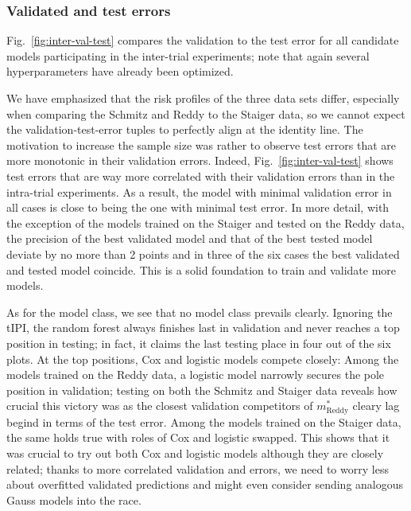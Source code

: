 \subsubsection{Validated and test errors}



Fig.\ \ref{fig:inter-val-test} compares the validation to the test error for all candidate models 
participating in the inter-trial experiments; note that again several hyperparameters have already 
been optimized. 

We have emphasized that the risk profiles of the three data sets differ, especially when comparing 
the Schmitz and Reddy to the Staiger data, so we cannot expect the validation-test-error tuples 
to perfectly align at the identity line. The motivation to increase the sample size was rather 
to observe test errors that are more monotonic in their validation errors. Indeed, Fig.\ 
\ref{fig:inter-val-test} shows test errors that are way more correlated with their validation errors 
than in the intra-trial experiments. As a result, the model with minimal validation error in all 
cases is close to being the one with minimal test error. In more detail, with the exception of 
the models trained on the Staiger and tested on the Reddy data, the precision of the best 
validated model and that of the best tested model deviate by no more than \num{2} points and in 
three of the six cases the best validated and tested model coincide. This is a solid foundation 
to train and validate more models.

As for the model class, we see that no model class prevails clearly. Ignoring the tIPI, the random 
forest always finishes last in validation and never reaches a top position in testing; in fact, 
it claims the last testing place in four out of the six plots. At the top positions, Cox and 
logistic models compete closely: Among the models trained on the Reddy data, a logistic model 
narrowly secures the pole position in validation; testing on both the Schmitz and Staiger 
data reveals how crucial this victory was as the closest validation competitors of 
$m^*_\text{Reddy}$ cleary lag begind in terms of the test error. Among the models trained on the 
Staiger data, the same holds true with roles of Cox and logistic swapped. This shows that it 
was crucial to try out both Cox and logistic models although they are closely related; thanks to 
more correlated validation and errors, we need to worry less about overfitted validated 
predictions and might even consider sending analogous Gauss models into the race.

